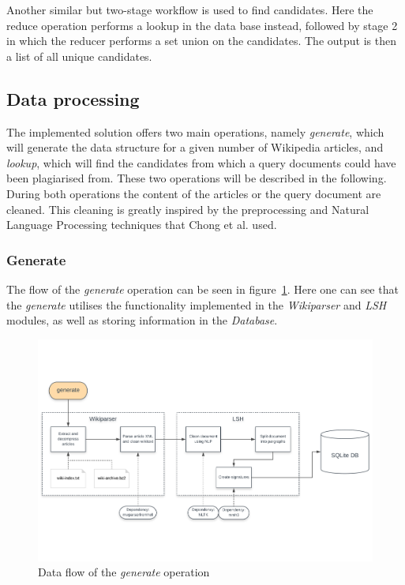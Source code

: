 Another similar but two-stage workflow is used to find candidates. Here the reduce operation performs a lookup in the data base instead, followed by stage 2 in which the reducer performs a set union on the candidates. The output is then a list of all unique candidates.

\subsection{Data processing}
The implemented solution offers two main operations, namely \emph{generate}, which will generate the data structure for a given number of Wikipedia articles, and \emph{lookup}, which will find the candidates from which a query documents could have been plagiarised from. These two operations will be described in the following. During both operations the content of the articles or the query document are cleaned. This cleaning is greatly inspired by the preprocessing and Natural Language Processing techniques that Chong et al. used.\cite{chong2010using}

\subsubsection{Generate}
\label{sec:gen}
The flow of the \emph{generate} operation can be seen in figure~\ref{fig:generate}. Here one can see that the \emph{generate} utilises the functionality implemented in the \emph{Wikiparser} and \emph{LSH} modules, as well as storing information in the \emph{Database}.

\begin{figure}[ht]
	\centering
    \includegraphics[width = \linewidth]{docs/report/input/generate.pdf}
    \captionsetup{width = \linewidth}
    \caption{Data flow of the \emph{generate} operation}
    \label{fig:generate}
\end{figure}

